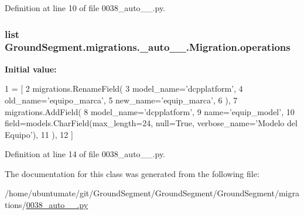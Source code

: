 Definition at line 10 of file 0038\+\_\+auto\+\_\+\_.\+py.

\hypertarget{class_ground_segment_1_1migrations_1_10038__auto__20170131__1731_1_1_migration_ac962eca1e5bcdc65db10f1d523cbcace}{}
\subsubsection[{operations}]{\setlength{\rightskip}{0pt plus 5cm}list Ground\+Segment.\+migrations.\+\_\+auto\+\_\+\_.\+Migration.\+operations\hspace{0.3cm}{\ttfamily [static]}}\label{class_ground_segment_1_1migrations_1_10038__auto__20170131__1731_1_1_migration_ac962eca1e5bcdc65db10f1d523cbcace}
{\bfseries Initial value\+:}
\begin{DoxyCode}
1 = [
2         migrations.RenameField(
3             model\_name=\textcolor{stringliteral}{'dcpplatform'},
4             old\_name=\textcolor{stringliteral}{'equipo\_marca'},
5             new\_name=\textcolor{stringliteral}{'equip\_marca'},
6         ),
7         migrations.AddField(
8             model\_name=\textcolor{stringliteral}{'dcpplatform'},
9             name=\textcolor{stringliteral}{'equip\_model'},
10             field=models.CharField(max\_length=24, null=\textcolor{keyword}{True}, verbose\_name=\textcolor{stringliteral}{'Modelo del Equipo'}),
11         ),
12     ]
\end{DoxyCode}


Definition at line 14 of file 0038\+\_\+auto\+\_\+\_.\+py.



The documentation for this class was generated from the following file\+:\begin{DoxyCompactItemize}
\item 
/home/ubuntumate/git/\+Ground\+Segment/\+Ground\+Segment/\+Ground\+Segment/migrations/\hyperlink{0038__auto__20170131__1731_8py}{0038\+\_\+auto\+\_\+\_.\+py}\end{DoxyCompactItemize}
